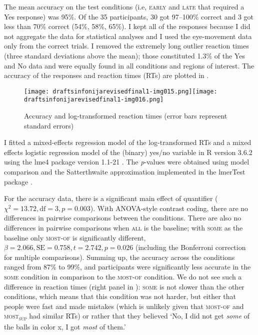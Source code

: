 \documentclass[output=paper]{langscibook}
\begin{document}
The mean accuracy on the test conditions (i.e, \textsc{early} and \textsc{late} that required a Yes response) was 95\%. Of the 35
participants, 30 got 97--100\% correct and 3 got less than 70\% correct (54\%, 58\%, 65\%). I kept all of the responses
because I did not aggregate the data for statistical analyses and I used the eye-movement data only from the correct
trials. I removed the extremely long outlier reaction times (three standard deviations above the mean); those
constituted 1.3\% of the Yes and No data and were equally found in all conditions and regions of interest. The accuracy
of the responses and reaction times (RTs) are plotted in .

\begin{figure} 
    \texttt{[image: draftsinfonijarevisedfinal1-img015.png]}\hfill\texttt{[image: draftsinfonijarevisedfinal1-img016.png]}
\caption{Accuracy and log-transformed reaction times (error bars represent standard errors)\label{tom:fig:plots}}
\end{figure}


I fitted a mixed-effects regression model of the log-transformed RTs and a mixed effects logistic regression model of
the (binary) yes/no variable in R version 3.6.2 \citep{rcore}  using the lme4 package version 1.1-21 \citet{lme4}. The \textit{p}{}-values were obtained using model comparison and the Satterthwaite approximation implemented in
the lmerTest package \citep{kuznetsova2017lmertest}. 

For the accuracy data, there is a significant main effect of quantifier ($\chi ^2=13.72, \text{df}=3,
p=0.003$). With ANOVA-style contrast coding, there are no differences in pairwise comparisons between the
conditions. There are also no differences in pairwise comparisons when \textsc{all} is the baseline; with \textsc{some} as the baseline only \textsc{most-of} is significantly different, $\beta =2.066, \text{SE}=0.758, t=2.742, p=0.026$ (including the Bonferroni correction for multiple comparisons). Summing up, the accuracy across the conditions ranged from 87\% to 99\%, and participants were significantly less accurate in the \textsc{some} condition in comparison to the \textsc{most-of} condition. We do not see such a difference in reaction times (right panel in ): \textsc{some} is not slower than the other conditions, which means that
this condition was not harder, but either that people were fast and made mistakes (which is unlikely given that
\textsc{most-of} and \textsc{most\textsubscript{sup}} had similar RTs) or rather that they believed ‘No, I did
not get \textit{some} of the balls in color x, I got \textit{most} of them.’
\end{document}
